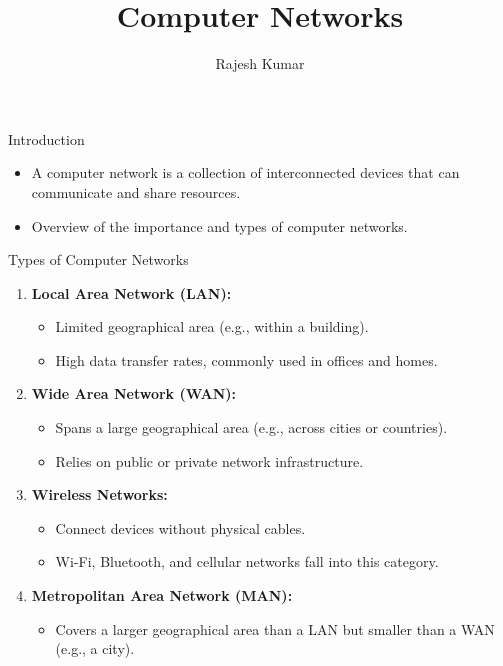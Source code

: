 \title{Computer Networks}
\author{Rajesh Kumar}
\date{}

\begin{frame}
  \titlepage
\end{frame}

\begin{frame}{Introduction}
  \begin{itemize}
    \item A computer network is a collection of interconnected devices that can communicate and share resources.
    \item Overview of the importance and types of computer networks.
  \end{itemize}
\end{frame}

\begin{frame}{Types of Computer Networks}
  \begin{enumerate}
    \item \textbf{Local Area Network (LAN):}
      \begin{itemize}
        \item Limited geographical area (e.g., within a building).
        \item High data transfer rates, commonly used in offices and homes.
      \end{itemize}
    \item \textbf{Wide Area Network (WAN):}
      \begin{itemize}
        \item Spans a large geographical area (e.g., across cities or countries).
        \item Relies on public or private network infrastructure.
      \end{itemize}
    \item \textbf{Wireless Networks:}
      \begin{itemize}
        \item Connect devices without physical cables.
        \item Wi-Fi, Bluetooth, and cellular networks fall into this category.
      \end{itemize}
    \item \textbf{Metropolitan Area Network (MAN):}
      \begin{itemize}
        \item Covers a larger geographical area than a LAN but smaller than a WAN (e.g., a city).
      \end{itemize}
  \end{enumerate}
\end{frame}

